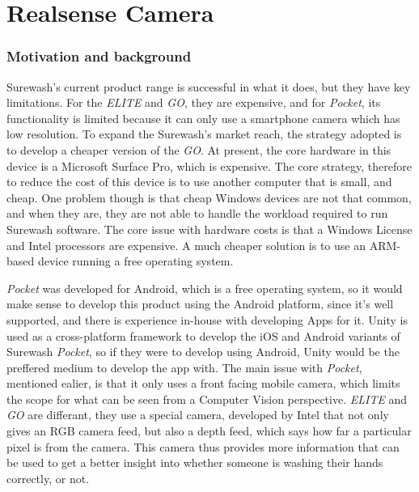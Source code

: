 \part{Realsense Camera}
\section{Motivation and background}
Surewash's current product range is successful in what it does, but they have key limitations. For the {\slshape ELITE} and {\slshape GO}, they are expensive, and for {\slshape Pocket}, its functionality is limited because it can only use a smartphone camera which has low resolution. To expand the Surewash's market reach, the strategy adopted is to develop a cheaper version of the {\slshape GO}. At present, the core hardware in this device is a Microsoft Surface Pro, which is expensive. The core strategy, therefore to reduce the cost of this device is to use another computer that is small, and cheap. One problem though is that cheap Windows devices are not that common, and when they are, they are not able to handle the workload required to run Surewash software. The core issue with hardware costs is that a Windows License and Intel processors are expensive. A much cheaper solution is to use an ARM-based device running a free operating system.

{\slshape Pocket} was developed for Android, which is a free operating system, so it would make sense to develop this product using the Android platform, since it's well supported, and there is experience in-house with developing Apps for it. Unity is used as a cross-platform framework to develop the iOS and Android variants of Surewash {\slshape Pocket}, so if they were to develop using Android, Unity would be the preffered medium to develop the app with. The main issue with {\slshape Pocket}, mentioned ealier, is that it only uses a front facing mobile camera, which limits the scope for what can be seen from a Computer Vision perspective. {\slshape ELITE} and {\slshape GO} are differant, they use a special camera, developed by Intel that not only gives an RGB camera feed, but also a depth feed, which says how far a particular pixel is from the camera. This camera thus provides more information that can be used to get a better insight into whether someone is washing their hands correctly, or not.

